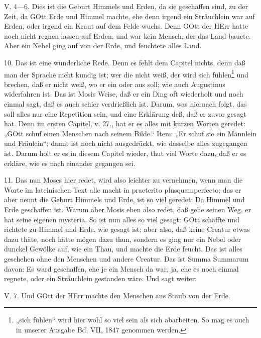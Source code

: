\begin{schriftzitat}
V. 4—6. Dies ist die Geburt Himmels und Erden, da sie geschaffen sind, zu der Zeit, da GOtt Erde und Himmel machte, ehe denn irgend ein Sträuchlein war auf Erden, oder irgend ein Kraut auf dem Felde wuchs. Denn GOtt der HErr hatte noch nicht regnen lassen auf Erden, und war kein Mensch, der das Land bauete. Aber ein Nebel ging auf von der Erde, und feuchtete alles Land.
\end{schriftzitat}

10. Das ist eine wunderliche Rede. Denn es fehlt dem Capitel nichts, denn daß man der Sprache nicht kundig ist; wer die nicht weiß, der wird sich fühlen\footnote{„sich fühlen“ wird hier wohl so viel sein als sich abarbeiten. So mag es auch in unserer Ausgabe Bd. VII, 1847 genommen werden.} und brechen, daß er nicht weiß, wo er ein oder aus soll; wie auch Augustinus widerfahren ist. Das ist Mosis Weise, daß er ein Ding oft wiederholt und noch einmal sagt, daß es auch schier verdrießlich ist. Darum, was hiernach folgt, das soll alles nur eine Repetition sein, und eine Erklärung deß, daß er zuvor gesagt hat. Denn im ersten Capitel, v. 27., hat er es alles mit kurzen Worten geredet: „GOtt schuf einen Menschen nach seinem Bilde.“ Item: „Er schuf sie ein Männlein und Fräulein“; damit ist noch nicht ausgedrückt, wie dasselbe alles zugegangen ist. Darum holt er es in diesem Capitel wieder, thut viel Worte dazu, daß er es erkläre, wie es nach einander gegangen sei.

11. Das nun Moses hier redet, wird also leichter zu vernehmen, wenn man die Worte im lateinischen Text alle macht in praeterito plusquamperfecto; das er aber nennt die Geburt Himmels und Erde, ist so viel geredet: Da Himmel und Erde geschaffen ist. Warum aber Mosis eben also redet, daß gehe seinen Weg, er hat seine eigenen mysteria. So ist nun alles so viel gesagt: GOtt schaffte und richtete zu Himmel und Erde, wie gesagt ist; aber also, daß keine Creatur etwas dazu thäte, noch hätte mögen dazu thun, sondern es ging nur ein Nebel oder dunckel Gewölke auf, wie ein Thau, und machte die Erde feucht. Das ist alles geschehen ohne den Menschen und andere Creatur. Das ist Summa Summarum davon: Es ward geschaffen, ehe je ein Mensch da war, ja, ehe es noch einmal regnete, oder ein Sträuchlein gestanden wäre. Und sagt weiter:

\begin{schriftzitat}
V. 7. Und GOtt der HErr machte den Menschen aus Staub von der Erde.
\end{schriftzitat}

